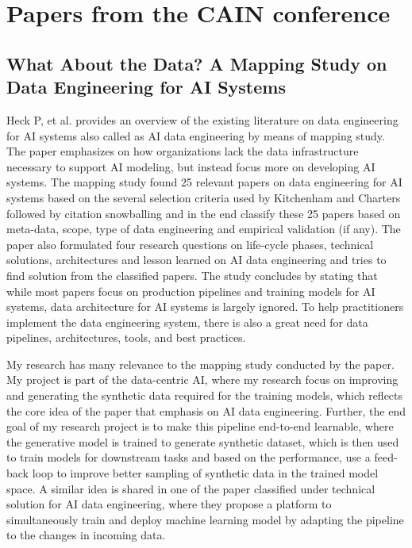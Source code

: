 \documentclass[a4paper, 11pt]{article}
\begin{document}
\section{Papers from the CAIN conference}
\subsection{What About the Data? A Mapping Study on Data Engineering for
AI Systems}
Heck P, et al. \cite{heck2024data} provides an overview of the existing literature on data engineering for AI systems also called as AI data engineering by means of mapping study. The paper emphasizes on how organizations lack the data infrastructure necessary to support AI modeling, but instead focus more on developing AI systems. The mapping study found 25 relevant papers on data engineering for AI systems based on the several selection criteria used by Kitchenham and Charters \cite{keele2007guidelines} followed by citation snowballing and in the end classify these 25 papers based on meta-data, scope, type of data engineering and empirical validation (if any). The paper also formulated four research questions on life-cycle phases, technical solutions, architectures and lesson learned on AI data engineering and tries to find solution from the classified papers.  The study concludes by stating that while most papers focus on production pipelines and training models for AI systems, data architecture for AI systems is largely ignored. To help practitioners implement the data engineering system, there is also a great need for data pipelines, architectures, tools, and best practices. 

My research has many relevance to the mapping study conducted by the paper. My project is part of the data-centric AI, where my research focus on improving and generating the synthetic data required for the training models, which reflects the core idea of the paper that emphasis on AI data engineering. Further, the end goal of my research project is to make this pipeline end-to-end learnable, where the generative model is trained to generate synthetic dataset, which is then used to train models for downstream tasks and based on the performance, use a feed-back loop to improve better sampling of synthetic data in the trained model space. A similar idea is shared in one of the paper classified under technical solution for AI data engineering, where they propose a platform to simultaneously train and deploy machine learning model by adapting the pipeline to the changes in incoming data. 
\end{document}

